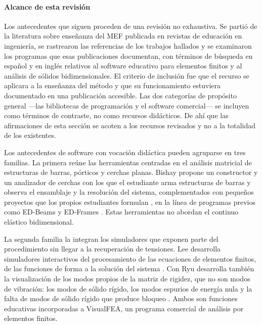 \paragraph{Alcance de esta revisión} Los antecedentes que siguen proceden de una revisión no exhaustiva. Se partió de la literatura sobre enseñanza del MEF publicada en revistas de educación en ingeniería, se rastrearon las referencias de los trabajos hallados y se examinaron los programas que esas publicaciones documentan, con términos de búsqueda en español y en inglés relativos al software educativo para elementos finitos y al análisis de sólidos bidimensionales. El criterio de inclusión fue que el recurso se aplicara a la enseñanza del método y que su funcionamiento estuviera documentado en una publicación accesible. Las dos categorías de propósito general —las bibliotecas de programación y el software comercial— se incluyen como términos de contraste, no como recursos didácticos. De ahí que las afirmaciones de esta sección se acoten a los recursos revisados y no a la totalidad de los existentes.

Los antecedentes de software con vocación didáctica pueden agruparse en tres familias. La primera reúne las herramientas centradas en el análisis matricial de estructuras de barras, pórticos y cerchas planas. Bishay propone un constructor y un analizador de cerchas con los que el estudiante arma estructuras de barras y observa el ensamblaje y la resolución del sistema, complementados con pequeños proyectos que los propios estudiantes formulan \autocite[pp.~1011-1012]{bishay2020teaching}, en la línea de programas previos como ED-Beams y ED-Frames \autocite[pp.~243-244]{suarez1998edelas2d}. Estas herramientas no abordan el continuo elástico bidimensional.

La segunda familia la integran los simuladores que exponen parte del procedimiento sin llegar a la recuperación de tensiones. Lee desarrolla simuladores interactivos del procesamiento de las ecuaciones de elementos finitos, de las funciones de forma a la solución del sistema \autocite[pp.~157-158]{lee2015interactive}. Con Ryu desarrolla también la visualización de los modos propios de la matriz de rigidez, que no son modos de vibración: los modos de sólido rígido, los modos espurios de energía nula y la falta de modos de sólido rígido que produce bloqueo \autocite[pp.~872, 878, 881]{lee2015eigenmodes}. Ambos son funciones educativas incorporadas a VisualFEA, un programa comercial de análisis por elementos finitos.

